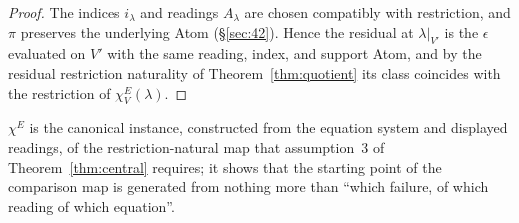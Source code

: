 \begin{proof}
The indices $i_\lambda$ and readings $A_\lambda$ are chosen compatibly
with restriction, and $\pi$ preserves the underlying Atom
(\S\ref{sec:42}). Hence the residual at $\lambda|_{V'}$ is the
$\epsilon$ evaluated on $V'$ with the same reading, index, and support
Atom, and by the residual restriction naturality of
Theorem~\ref{thm:quotient} its class coincides with the restriction of
$\chi^E_V(\lambda)$.
\end{proof}

$\chi^E$ is the canonical instance, constructed from the equation system
and displayed readings, of the restriction-natural map that assumption~3
of Theorem~\ref{thm:central} requires; it shows that the starting point
of the comparison map is generated from nothing more than ``which
failure, of which reading of which equation''.
